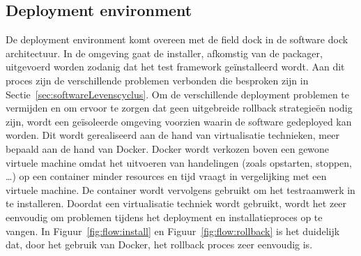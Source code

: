 \subsection{Deployment environment}
De deployment environment komt overeen met de field dock in de software dock architectuur.
In de omgeving gaat de installer, afkomstig van de packager, uitgevoerd worden zodanig dat het test framework geïnstalleerd wordt.
Aan dit proces zijn de verschillende problemen verbonden die besproken zijn in Sectie~\vref{sec:softwareLevenscyclus}.
Om de verschillende deployment problemen te vermijden en om ervoor te zorgen dat geen uitgebreide rollback strategieën nodig zijn, wordt een geïsoleerde omgeving voorzien waarin de software gedeployed kan worden. 
Dit wordt gerealiseerd aan de hand van virtualisatie technieken, meer bepaald aan de hand van Docker.
Docker wordt verkozen boven een gewone virtuele machine omdat het uitvoeren van handelingen (zoals opstarten, stoppen, \ldots) op een container minder resources en tijd vraagt in vergelijking met een virtuele machine.
De container wordt vervolgens gebruikt om het testraamwerk in te installeren.
Doordat een virtualisatie techniek wordt gebruikt, wordt het zeer eenvoudig om problemen tijdens het deployment en installatieproces op te vangen.
In Figuur~\vref{fig:flow:install} en Figuur~\vref{fig:flow:rollback} is het duidelijk dat, door het gebruik van Docker, het rollback proces zeer eenvoudig is.
